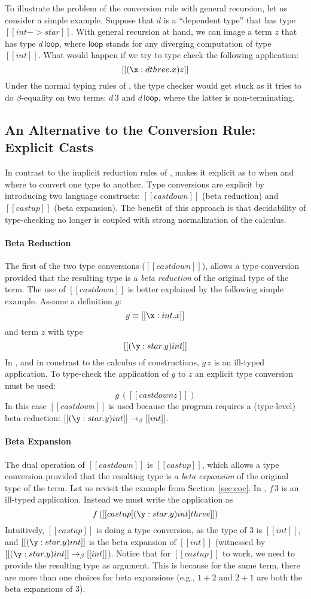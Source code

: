 To illustrate the problem of the conversion rule with general
recursion, let us consider a simple example. Suppose that
$d$ is a ``dependent type'' that has type $[[int -> star]]$. With
general recursion at hand, we can image a term $z$ that has type
$d\,\mathsf{loop}$, where $\mathsf{loop}$ stands for any diverging
computation of type $[[int]]$. What would happen if we try to type
check the following application: \[ [[(\x: d three.x)z]]\]
Under the normal typing rules of \coc, the type checker would get
stuck as it tries to do $\beta$-equality on two terms: $d\,3$ and
$d\,\mathsf{loop}$, where the latter is non-terminating.  

\subsection{An Alternative to the Conversion Rule: Explicit Casts}

In contrast to the implicit
reduction rules of \coc, \name makes it explicit as to when and where
to convert one type to another. Type conversions are explicit by
introducing two language constructs: $[[castdown]]$ (beta reduction)
and $[[castup]]$ (beta expansion). The benefit of this approach is
that decidability of type-checking no longer is coupled with strong
normalization of the calculus.

\paragraph{Beta Reduction} The first of the two type conversions
($[[castdown]]$), allows a type conversion provided that the resulting
type is a \emph{beta reduction} of the original type of the term. The
use of $[[castdown]]$ is better explained by the following simple
example. Assume a definition $g$:
\[ g \equiv [[\x:int.x]] \]
and term $z$ with type
\[ [[(\y:star.y)int]] \]
In \name, and in constrast to the calculus of constructions,
$ g\,z $ is an ill-typed application. To type-check 
the application of $g$ to $z$ an explicit type conversion 
must be used:
\[ g\,([[castdown z]]) \]
In this case $[[castdown]]$ is used because the program requires 
a (type-level) beta-reduction: 
$[[(\y:star.y)int]] \rightarrow_{\beta} [[int]]$. 

\paragraph{Beta Expansion} The dual operation of $[[castdown]]$ is
$[[castup]]$, which allows a type conversion provided that the
resulting type is a \emph{beta expansion} of the original type of the
term.  Let us revisit the example from Section~\ref{sec:coc}. In \name,
$f\,3$ is an ill-typed application. Instead we must write the
application as
\[ f\,([[castup[(\y:star.y)int] three]]) \]
Intuitively,
$[[castup]]$ is doing a type conversion, as the type of $ 3 $ is
$ [[int]] $, and $ [[(\y:star.y)int]] $ is the beta expansion of
$[[int]]$ (witnessed by
$[[(\y:star.y)int]] \rightarrow_{\beta} [[int]]$). Notice that for
$[[castup]]$ to work, we need to provide the resulting type as
argument. This is because for the same term, there are more than one
choices for beta expansions (e.g., $1 + 2$ and $2 + 1$ are both the
beta expansions of $3$). 

